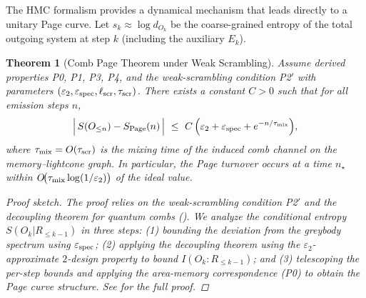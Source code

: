 \documentclass[a4paper,11pt]{article}
\newcommand{\HMC}{\textsc{HMC}\xspace}
\theoremstyle{plain}
\newtheorem{theorem}{Theorem}
\theoremstyle{definition}
\theoremstyle{remark}
\begin{document}
The \HMC{} formalism provides a dynamical mechanism that leads directly to a unitary Page curve. Let $s_k \approx \log d_{O_k}$ be the coarse-grained entropy of the total outgoing system at step $k$ (including the auxiliary $E_k$).
%
\begin{theorem}[Comb Page Theorem under Weak Scrambling]\label{thm:comb-page-weak}
Assume derived properties P0, P1, P3, P4, and the weak-scrambling condition P2$'$ with parameters $(\varepsilon_2,\varepsilon_{\rm spec},\ell_{\rm scr},\tau_{\rm scr})$. There exists a constant $C>0$ such that for all emission steps $n$,
\begin{equation}
\Big|\, S(O_{\le n}) - S_{\rm Page}(n)\,\Big| \ \le\ C\,\Big(\varepsilon_2 + \varepsilon_{\rm spec} + e^{-n/\tau_{\rm mix}} \Big),
\end{equation}
where $\tau_{\rm mix}=O(\tau_{\rm scr})$ is the mixing time of the induced comb channel on the memory--lightcone graph. In particular, the Page turnover occurs at a time $n_\star$ within $O\!\big(\tau_{\rm mix}\log(1/\varepsilon_2)\big)$ of the ideal value.
\begin{proof}[Proof sketch]
The proof relies on the weak-scrambling condition P2$'$ and the decoupling theorem for quantum combs (). We analyze the conditional entropy $S(O_k|R_{\le k-1})$ in three steps: (1) bounding the deviation from the greybody spectrum using $\varepsilon_{\rm spec}$; (2) applying the decoupling theorem using the $\varepsilon_2$-approximate $2$-design property to bound $I(O_k:R_{\le k-1})$; and (3) telescoping the per-step bounds and applying the area-memory correspondence (P0) to obtain the Page curve structure. See  for the full proof.
\end{proof}
\end{theorem}
\end{document}
